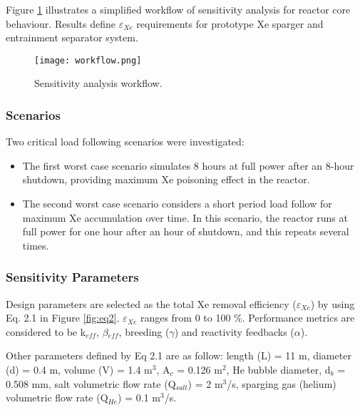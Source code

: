     Figure \ref{fig:workflow} illustrates a simplified workflow of sensitivity analysis for reactor core behaviour. Results define $\varepsilon$$_{Xe}$
    requirements for prototype Xe sparger and entrainment separator system.

    \begin{figure}[htbp!]
        \begin{center}
            \texttt{[image: workflow.png]}
        \end{center}
        \caption{Sensitivity analysis workflow.}
        \label{fig:workflow}
    \end{figure}

\subsubsection{Scenarios}

    Two critical load following scenarios were investigated:
    \begin{itemize}
        \item The first worst case scenario simulates 8 hours at full power
        after an 8-hour shutdown, providing maximum Xe poisoning effect in the
        reactor.
        \item The second worst case scenario considers a short period load
        follow for maximum Xe accumulation over time. In this scenario,
        the reactor runs at full power for one hour after an hour of shutdown,
        and this repeats several times.
    \end{itemize}

\subsubsection{Sensitivity Parameters}

    Design parameters are selected as the total Xe removal efficiency
    ($\varepsilon$$_{Xe}$) by using Eq. 2.1 \cite{rykhlevskii_fuel_2020} in
    Figure \ref{fig:eq2}. $\varepsilon$$_{Xe}$ ranges from 0 to 100 \%.
    Performance metrics are considered to be k$_{eff}$, $\beta$$_{eff}$,
    breeding ($\gamma$) and reactivity feedbacks ($\alpha$).

    Other parameters defined by Eq 2.1 are as follow: length (L) = 11 m,
    diameter (d) = 0.4 m, volume (V) = 1.4 m$^{3}$, A$_c$ = 0.126 m$^{2}$, He
    bubble diameter, d$_b$ = 0.508 mm, salt volumetric flow rate (Q$_{salt}$) =
    2 m$^{3}$/s, sparging gas (helium) volumetric flow rate (Q$_{He}$) = 0.1
    m$^{3}$/s.

